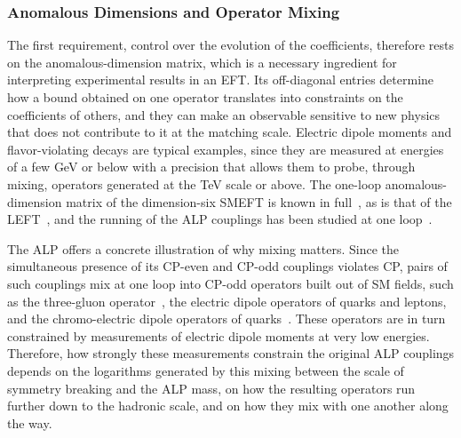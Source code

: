 \subsubsection*{Anomalous Dimensions and Operator Mixing}

The first requirement, control over the evolution of the coefficients, therefore rests on the
anomalous-dimension matrix, which is a necessary ingredient for interpreting experimental results in
an EFT. Its off-diagonal entries determine how a bound obtained on one operator translates into
constraints on the coefficients of others, and they can make an observable sensitive to new physics
that does not contribute to it at the matching scale. Electric dipole moments and flavor-violating
decays are typical examples, since they are measured at energies of a few GeV or below with a
precision that allows them to probe, through mixing, operators generated at the TeV scale or
above. The one-loop anomalous-dimension matrix of the
dimension-six SMEFT is known in
full~\cite{Jenkins:2013zja,Jenkins:2013wua,Alonso:2013hga,Alonso:2014zka}, as is that of the
LEFT~\cite{Jenkins:2017jig,Jenkins:2017dyc}, and the running of the ALP couplings has been studied
at one loop~\cite{Bauer:2020jbp,Chala:2020wvs,DasBakshi:2023lca}.

The ALP offers a concrete illustration of why mixing matters. Since the simultaneous presence of its
CP-even and CP-odd couplings violates CP, pairs of such couplings mix at one loop into CP-odd
operators built out of SM fields, such as the three-gluon operator~\cite{Weinberg:1989dx}, the electric dipole operators of quarks and leptons, and the
chromo-electric dipole operators of quarks~\cite{Marciano:2016yhf,DiLuzio:2020oah,DiLuzio:2023cuk}.
These operators are in turn constrained by measurements of electric dipole moments at very low
energies. Therefore, how strongly these measurements constrain the original ALP couplings depends on
the logarithms generated by this mixing between the scale of symmetry breaking and the ALP mass, on
how the resulting operators run further down to the hadronic scale, and on how they mix with one
another along the way.

